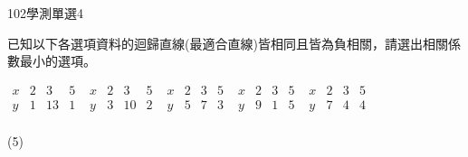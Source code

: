     \begin{QUESTION}
        \begin{ExamInfo}{102}{學測}{單選}{4}
        \end{ExamInfo}
        \begin{ExamAnsRateInfo}{30}{46}{25}{19}
        \end{ExamAnsRateInfo}
        \begin{QBODY}
            已知以下各選項資料的迴歸直線(最適合直線)皆相同且皆為負相關，請選出相關係數最小的選項。
			\begin{QOPS}
				\QOP $\begin{matrix}
				   x & 2 & 3 & 5  \\
				   y & 1 & 13 & 1  \\
				\end{matrix}$	
				\QOP $\begin{matrix}
				   x & 2 & 3 & 5  \\
				   y & 3 & 10 & 2  \\
				\end{matrix}$ 	
				\QOP $\begin{matrix}
				   x & 2 & 3 & 5  \\
				   y & 5 & 7 & 3  \\
				\end{matrix}$ 
				\QOP $\begin{matrix}
				   x & 2 & 3 & 5  \\
				   y & 9 & 1 & 5  \\
				\end{matrix}$	
				\QOP $\begin{matrix}
				   x & 2 & 3 & 5  \\
				   y & 7 & 4 & 4  \\
				\end{matrix}$
			\end{QOPS}
        \end{QBODY}
        \begin{QFROMS}
        \end{QFROMS}
        \begin{QTAGS}\end{QTAGS}
        \begin{QANS}
            (5)
        \end{QANS}
        \begin{QSOLLIST}
        \end{QSOLLIST}
        \begin{QEMPTYSPACE}
        \end{QEMPTYSPACE}
    \end{QUESTION}
